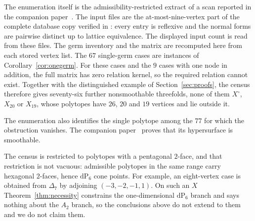 \documentclass[11pt]{amsart}
\theoremstyle{definition}
\theoremstyle{remark}
\theoremstyle{plain}
\newcommand{\dP}{\mathrm{dP}}
\begin{document}
The enumeration itself is the admissibility-restricted extract of a
scan reported in the companion paper~\cite{PaperV}.  The input files are
the at-most-nine-vertex part of the complete database copy verified in
\cite[\S6.1]{PaperI}: every entry is reflexive and the normal forms are
pairwise distinct up to lattice equivalence.  The displayed input count
is read from these files.  The germ inventory and
the matrix are recomputed here from each stored vertex list.  The
$67$ single-germ cases are instances of Corollary~\ref{cor:onegerm}.
For these cases and the $9$ cases with one node in addition, the full
matrix has zero relation kernel, so the required relation cannot exist.
Together with the distinguished example of Section~\ref{sec:proofs}, the
census therefore gives seventy-six further nonsmoothable threefolds, none of them
$X^{\circ}$, $X_{20}$ or $X_{19}$, whose polytopes have $26$, $20$
and $19$ vertices and lie outside it.

The enumeration also identifies the single polytope among the $77$ for
which the obstruction vanishes.  The companion paper~\cite{PaperV} proves
that its hypersurface is smoothable.

The census is restricted to polytopes with a pentagonal $2$-face, and that
restriction is not vacuous: admissible polytopes in the same range carry
hexagonal $2$-faces, hence $\dP_6$ cone points.  For example, an eight-vertex
case is obtained from $\Delta_7$ by adjoining $(-3,-2,-1,1)$.  On
such an $X$ Theorem~\ref{thm:necessity} constrains the one-dimensional $\dP_6$
branch and says nothing about the $A_2$ branch, so the conclusions above do not
extend to them and we do not claim them.
\end{document}
